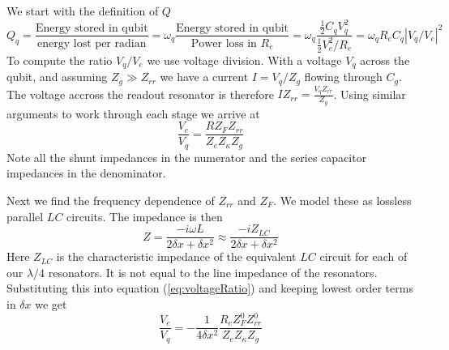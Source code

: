 \documentclass[english,aps,prl]{revtex4}
\begin{document}
We start with the definition of $Q$ \begin{equation}
Q_q = \frac{\textrm{Energy stored in qubit}} {\textrm{energy lost per radian}} = \omega_q \frac{\textrm{Energy stored in qubit}}{\textrm{Power loss in }R_e} = \omega_q \frac{\frac{1}{2}C_qV_q^2}{\frac{1}{2}V_e^2/R_e} = \omega_q R_eC_q \left| V_q/V_e \right|^2 \label{eq:qubitQ} \end{equation}
To compute the ratio $V_q/V_e$ we use voltage division. With a voltage $V_q$ across the qubit, and assuming $Z_g \gg Z_{rr}$ we have a current $I = V_q/Z_g$ flowing through $C_g$. The voltage accross the readout resonator is therefore $IZ_{rr}=\frac{V_q Z_{rr}}{Z_g}$. Using similar arguments to work through each stage we arrive at \begin{equation}
\frac{V_e}{V_q} = \frac{R Z_F Z_{rr}}{Z_e Z_{\kappa} Z_g} \label{eq:voltageRatio} \end{equation}
Note all the shunt impedances in the numerator and the series capacitor impedances in the denominator.

Next we find the frequency dependence of $Z_{rr}$ and $Z_F$. We model these as lossless parallel $LC$ circuits. The impedance is then \begin{equation}
Z = \frac{-i\omega L}{2\delta x + \delta x^2} \approx \frac{-iZ_{LC}}{2\delta x + \delta x^2}\end{equation}
Here $Z_{LC}$ is the characteristic impedance of the equivalent $LC$ circuit for each of our $\lambda/4$ resonators. It is not equal to the line impedance of the resonators. Substituting this into equation (\ref{eq:voltageRatio}) and keeping lowest order terms in $\delta x$ we get \begin{equation}
\frac{V_e}{V_q} = -\frac{1}{4\delta x^2}\frac{R_e Z_F^0 Z_{rr}^0}{Z_e Z_{\kappa} Z_g} \end{equation}
\end{document}
